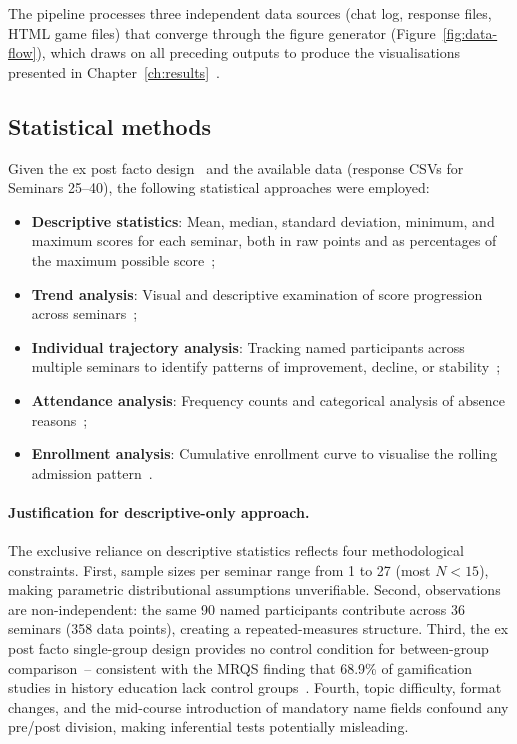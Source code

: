 The pipeline processes three independent data sources (chat log, response files, HTML game files) that converge through the figure generator (Figure~\ref{fig:data-flow}), which draws on all preceding outputs to produce the visualisations presented in Chapter~\ref{ch:results}~\cite{creswell}.

\subsection{Statistical methods}

Given the ex post facto design~\cite{creswell, ary} and the available data (response CSVs for Seminars 25--40), the following statistical approaches were employed:

\begin{itemize}
\item \textbf{Descriptive statistics}: Mean, median, standard deviation, minimum, and maximum scores for each seminar, both in raw points and as percentages of the maximum possible score~\cite{ary, creswell};
\item \textbf{Trend analysis}: Visual and descriptive examination of score progression across seminars~\cite{Korniienko2025mrqs};
\item \textbf{Individual trajectory analysis}: Tracking named participants across multiple seminars to identify patterns of improvement, decline, or stability~\cite{Hattie2009};
\item \textbf{Attendance analysis}: Frequency counts and categorical analysis of absence reasons~\cite{Thomas2008};
\item \textbf{Enrollment analysis}: Cumulative enrollment curve to visualise the rolling admission pattern~\cite{creswell}.
\end{itemize}

\paragraph{Justification for descriptive-only approach.}
The exclusive reliance on descriptive statistics reflects four methodological constraints. First, sample sizes per seminar range from 1 to 27 (most $N<15$), making parametric distributional assumptions unverifiable. Second, observations are non-independent: the same 90 named participants contribute across 36 seminars (358 data points), creating a repeated-measures structure. Third, the ex post facto single-group design provides no control condition for between-group comparison~-- consistent with the MRQS finding that 68.9\% of gamification studies in history education lack control groups~\cite{Korniienko2025mrqs}. Fourth, topic difficulty, format changes, and the mid-course introduction of mandatory name fields confound any pre/post division, making inferential tests potentially misleading.

